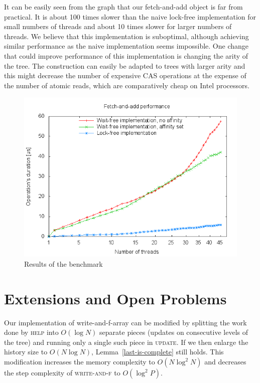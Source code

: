 \documentclass[a4paper,11pt]{article}
\newcommand{\fn}[1]{\textsc{#1}}
\begin{document}
It can be easily seen from the graph that our fetch-and-add object is far from practical. It is about 100 times slower than the naive lock-free implementation for small numbers of threads and about 10 times slower
for larger numbers of threads. We believe that this implementation is suboptimal, although achieving similar performance as the naive implementation seems impossible. One change that could improve performance
of this implementation is changing the arity of the tree. The construction can easily be adapted to trees with larger arity and this might decrease the number of expensive CAS operations at the expense of the number
of atomic reads, which are comparatively cheap on Intel processors.

\begin{figure}
\includegraphics{meas.png}
\caption{Results of the benchmark}
\label{fig-meas}
\end{figure}

\section{Extensions and Open Problems}

Our implementation of write-and-f-array can be modified by splitting the work done by \fn{help} into $O(\log N)$ separate pieces (updates on consecutive levels of the tree) and running only a single such piece in \fn{update}.
If we then enlarge the history size to $O(N\log N)$, Lemma~\ref{last-is-complete} still holds. This modification increases the memory complexity to $O(N\log^2N)$ and decreases the step complexity of
\fn{write-and-f} to $O(\log^2P)$.
\end{document}
